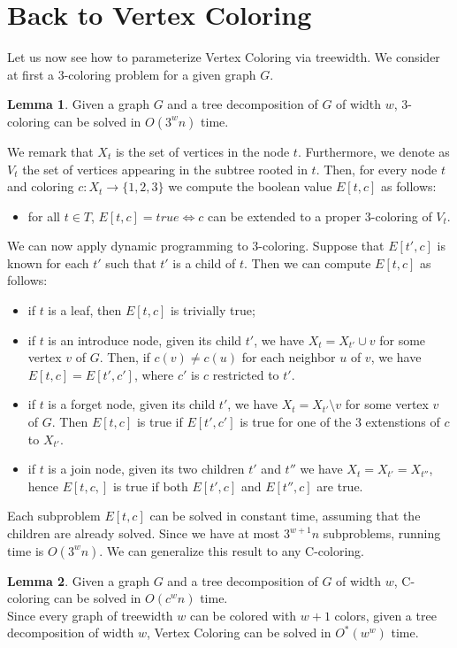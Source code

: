 \documentclass{article}
\theoremstyle{definition}
\theoremstyle{lemma}
\newtheorem{lemma}{Lemma}[section]
\theoremstyle{corollary}
\theoremstyle{theorem}
\begin{document}
\section{Back to Vertex Coloring}
Let us now see how to parameterize Vertex Coloring via treewidth. We consider at first a 3-coloring problem for a given graph $G$.
\begin{lemma}
	Given a graph $G$ and a tree decomposition of $G$ of width $w$, 3-coloring can be solved in
	$O(3^wn)$ time.
\end{lemma}
We remark that $X_t$ is the set of vertices in the node $t$. Furthermore, we denote as $V_t$ the set of vertices appearing in the subtree rooted in $t$. Then, for every node $t$ and coloring $c: X_t \rightarrow \{1,2,3\}$ we compute the boolean value $E[t,c]$ as follows:
\begin{itemize}
	\item for all $t \in T$, $E[t,c] = true \iff c$ can be extended to a proper 3-coloring of 
	$V_t$.
\end{itemize}
We can now apply dynamic programming to 3-coloring. Suppose that $E[t',c]$ is known for each $t'$ such that $t'$ is a child of $t$. Then we can compute $E[t,c]$ as follows:
\begin{itemize}
	\item if $t$ is a leaf, then $E[t,c]$ is trivially true;
	\item if $t$ is an introduce node, given its child $t'$, we have $X_t = X_{t'} \cup v$
	for some vertex $v$ of $G$.
	Then, if $c(v) \neq c(u)$ for each neighbor $u$ of $v$, we have $E[t,c] = E[t',c']$,
	where $c'$ is $c$ restricted to $t'$.
	\item if $t$ is a forget node, given its child $t'$, we have $X_t = X_{t'} \setminus v$
	for some vertex $v$ of $G$.
	Then $E[t,c]$ is true if $E[t',c']$ is true for one of the 3 extenstions of $c$ to $X_{t'}$.
	\item if $t$ is a join node, given its two children $t'$ and $t''$ we have 
	$X_t = X_{t'} = X_{t''}$, hence $E[t,c,]$ is true if both $E[t',c]$ and $E[t'',c]$ are true.
\end{itemize}
Each subproblem $E[t,c]$ can be solved in constant time, assuming that the children are already solved. Since we have at most $3^{w+1}n$ subproblems, running time is $O(3^wn)$.
We can generalize this result to any C-coloring.
\begin{lemma}
	Given a graph $G$ and a tree decomposition of $G$ of width $w$, C-coloring can be solved
	in $O(c^wn)$ time. \\
	Since every graph of treewidth $w$ can be colored with $w+1$ colors, given a tree
	decomposition of width $w$, Vertex Coloring can be solved in $O^*(w^w)$ time.
\end{lemma}
\end{document}
